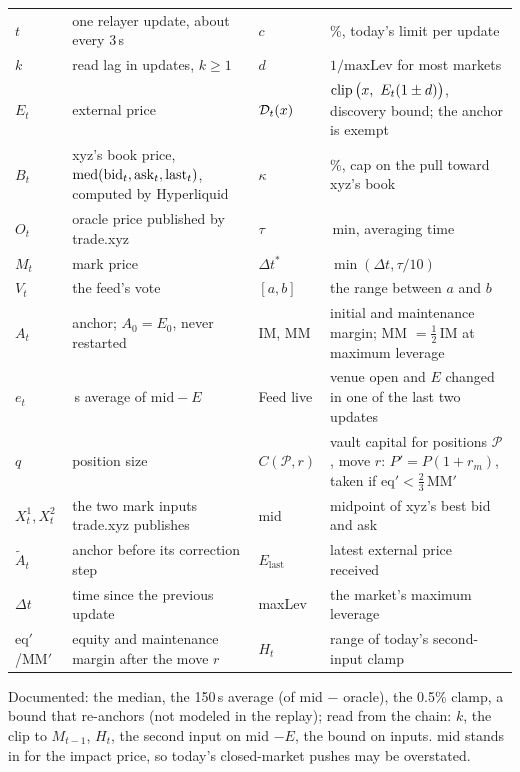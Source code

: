 \foot
\begin{exact}[Symbols]
{\footnotesize\renewcommand{\arraystretch}{1.0}\setlength{\tabcolsep}{4pt}
\begin{tabularx}{\linewidth}{@{}>{\raggedright\arraybackslash}p{1.35cm}>{\raggedright\arraybackslash}X>{\raggedright\arraybackslash}p{1.25cm}>{\raggedright\arraybackslash}X@{}}
$t$ & one relayer update, about every 3\,s & $c$ & 0.5\%, today's limit per update\\
$k$ & read lag in updates, $k \ge 1$ & $d$ & $1/\text{maxLev}$ for most markets\\
$E_t$ & external price & $\mathcal{D}_t(x)$ & $\clip\big(x,\ E_t(1\pm d)\big)$, discovery bound; the anchor is exempt\\
$B_t$ & xyz's book price, $\operatorname{med}(\text{bid}_t, \text{ask}_t, \text{last}_t)$, computed by Hyperliquid & $\kappa$ & 1\%, cap on the pull toward xyz's book\\
$O_t$ & oracle price published by trade.xyz & $\tau$ & 30\,min, averaging time\\
$M_t$ & mark price & $\Delta t^*$ & $\min(\Delta t, \tau/10)$\\
$V_t$ & the feed's vote & $[a,b]$ & the range between $a$ and $b$\\
$A_t$ & anchor; $A_0 = E_0$, never restarted & IM, MM & initial and maintenance margin; MM $= \tfrac12$\,IM at maximum leverage\\
$e_t$ & 150\,s average of $\text{mid} - E$ & Feed live & venue open and $E$ changed in one of the last two updates\\
$q$ & position size & $C(\mathcal{P},r)$ & vault capital for positions $\mathcal{P}$, move $r$: $P' = P(1+r_m)$, taken if $\text{eq}' < \tfrac23\,\text{MM}'$\\
$X^1_t, X^2_t$ & the two mark inputs trade.xyz publishes & mid & midpoint of xyz's best bid and ask\\
$\tilde A_t$ & anchor before its correction step & $E_{\text{last}}$ & latest external price received\\
$\Delta t$ & time since the previous update & maxLev & the market's maximum leverage\\
\mbox{eq$'$/MM$'$} & equity and maintenance margin after the move $r$ & $H_t$ & range of today's second-input clamp\\
\end{tabularx}}
\par\vspace{.2ex}Documented: the median, the 150\,s average (of mid $-$ oracle), the 0.5\% clamp, a bound that re-anchors (not modeled in the replay); read from the chain: $k$, the clip to $M_{t-1}$, $H_t$, the second input on mid $-E$, the bound on inputs. mid stands in for the impact price, so today's closed-market pushes may be overstated.
\end{exact}

